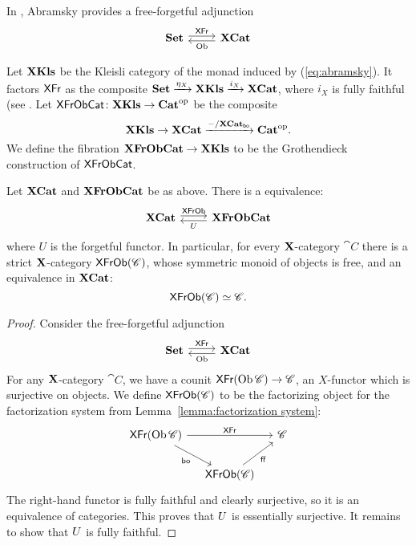 \documentclass[12pt,oneside,article,draft]{memoir}
\begin{document}
In \cite{Abramsky}, Abramsky provides a free-forgetful adjunction
\begin{equation}\label{eq:abramsky}
\begin{tikzcd}
\Cat{Set}\arrow[r, shift left=.5ex, "\Fun{XFr}"]&\XCat\arrow[l, shift left=.5ex,"\Ob"]
\end{tikzcd}
\end{equation}

\begin{definition}\label{def:XKls XFrObCat}

Let $\mathbf{XKls}$ be the Kleisli category of the monad induced by (\ref{eq:abramsky}). It factors $\mathsf{XFr}$ as the composite $\mathbf{Set}\xrightarrow{\eta_X}\mathbf{XKls}\xrightarrow{i_X}\mathbf{XCat}$, where $i_X$ is fully faithful  (see \cite[Proposition 4.2.1]{Borceux vol 2}.  Let $\mathsf{XFrObCat}\colon\mathbf{XKls}\to{\mathbf{Cat}}^{\text{op}}$ be the composite
$$\mathbf{XKls}\to\mathbf{XCat}\xrightarrow{-/\mathbf{XCat}_{\mathsf{bo}}}{\mathbf{Cat}}^{\text{op}}.$$
We define the fibration $\mathbf{XFrObCat}\to\mathbf{XKls}$ to be the Grothendieck construction of $\mathsf{XFrObCat}$.

\end{definition}

\begin{proposition}\label{prop:free objects}

Let $\mathbf{XCat}$ and $\mathbf{XFrObCat}$ be as above. There is a equivalence:
$$
\begin{tikzcd}
\XCat\arrow[r, shift left=.5ex, "\Fun{XFrOb}"]&\Cat{XFrObCat}\arrow[l, shift left=.5ex,"U"]
\end{tikzcd}
$$
where $U$ is the forgetful functor. In particular, for every $\mathbf{X}$-category $\cat{C}$ there is a strict $\mathbf{X}$-category $\mathsf{XFrOb}(\mathscr{C})$, whose symmetric monoid of objects is free, and an equivalence in $\mathbf{XCat}$:
$$\mathsf{XFrOb}(\mathscr{C})\simeq\mathscr{C}.$$

\end{proposition}

\begin{proof}

Consider the free-forgetful adjunction
$$
\begin{tikzcd}
\Cat{Set}\arrow[r, shift left=.5ex, "\Fun{XFr}"]&\XCat\arrow[l, shift left=.5ex,"\Ob"]
\end{tikzcd}
$$
For any $\mathbf{X}$-category $\cat{C}$, we have a counit $\mathsf{XFr}(\operatorname{Ob}\mathscr{C})\to\mathscr{C}$, an $X$-functor which is surjective on objects. We define $\mathsf{XFrOb}(\mathscr{C})$ to be the factorizing object for the factorization system from Lemma~\ref{lemma:factorization system}:
$$
\begin{tikzcd}[column sep=small]
\Fun{XFr}(\Ob\cat{C})\arrow[dr, "\bo"']\arrow[rr, "\Fun{XFr}"]&&\cat{C}\\
&\Fun{XFrOb}(\cat{C})\arrow[ur, "\ff"']
\end{tikzcd}
$$
The right-hand functor is fully faithful and clearly surjective, so it is an equivalence of categories. This proves that $U$ is essentially surjective. It remains to show that $U$ is fully faithful.


\end{proof}
\end{document}
